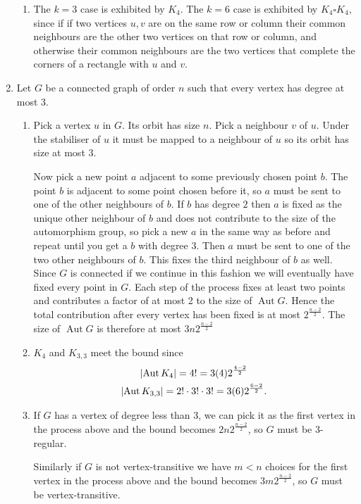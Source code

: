 \documentclass[a4paper, 12pt]{article}
\DeclarePairedDelimiter\abs{\lvert}{\rvert}
\DeclareMathOperator{\aut}{Aut}
\begin{document}
\begin{enumerate}
\begin{enumerate}
\item The \(k=3\) case is exhibited by \(K_4\). The \(k=6\) case is exhibited by \(K_4\square K_4\), since if if two vertices \(u,v\) are on the same row or column their common neighbours are the other two vertices on that row or column, and otherwise their common neighbours are the two vertices that complete the corners of a rectangle with \(u\) and \(v\).

\end{enumerate}

\item Let \(G\) be a connected graph of order \(n\) such that every vertex has degree at most 3.

\begin{enumerate}

\item Pick a vertex \(u\) in \(G\). Its orbit has size \(n\). Pick a neighbour \(v\) of \(u\). Under the stabiliser of \(u\) it must be mapped to a neighbour of \(u\) so its orbit has size at most 3.

Now pick a new point \(a\) adjacent to some previously chosen point \(b\). The point \(b\) is adjacent to some point chosen before it, so \(a\) must be sent to one of the other neighbours of \(b\). If \(b\) has degree \(2\) then \(a\) is fixed as the unique other neighbour of \(b\) and does not contribute to the size of the automorphism group, so pick a new \(a\) in the same way as before and repeat until you get a \(b\) with degree \(3\). Then \(a\) must be sent to one of the two other neighbours of \(b\). This fixes the third neighbour of \(b\) as well. Since \(G\) is connected if we continue in this fashion we will eventually have fixed every point in \(G\). Each step of the process fixes at least two points and contributes a factor of at most 2 to the size of \(\aut G\). Hence the total contribution after every vertex has been fixed is at most \(2^{\frac{n-2}2}\). The size of \(\aut G\) is therefore at most \(3n2^{\frac{n-2}2}\)

\item \(K_4\) and \(K_{3,3}\) meet the bound since
\begin{gather*}
\abs{\aut K_4}=4!=3(4)2^{\frac{4-2}2}\\
\abs{\aut K_{3,3}}=2!\cdot3!\cdot3!=3(6)2^{\frac{6-2}2}.
\end{gather*}

\item If \(G\) has a vertex of degree less than 3, we can pick it as the first vertex in the process above and the bound becomes \(2n2^{\frac{n-2}2}\), so \(G\) must be 3-regular.

Similarly if \(G\) is not vertex-transitive we have \(m<n\) choices for the first vertex in the process above and the bound becomes \(3m2^{\frac{n-2}2}\), so \(G\) must be vertex-transitive.



\end{enumerate}

\end{enumerate}
\end{document}
